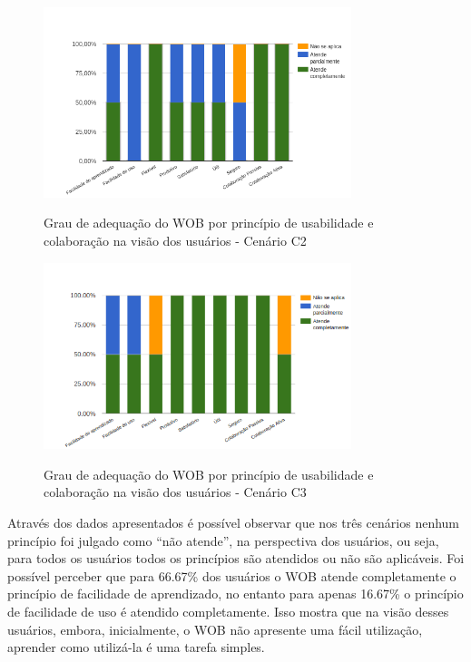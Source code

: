 \begin{figure}[!htb]
    \centering
    \caption{Grau de adequação do WOB por princípio de usabilidade e colaboração na visão dos usuários - Cenário C2}
    \includegraphics[width=0.8\textwidth]{./04-figuras/avaliacao-cenario2}
    \label{fig:avaliacao-cenario2}
\end{figure}

\begin{figure}[!htb]
    \centering
    \caption{Grau de adequação do WOB por princípio de usabilidade e colaboração na visão dos usuários - Cenário C3}
    \includegraphics[width=0.8\textwidth]{./04-figuras/avaliacao-cenario3}
    \label{fig:avaliacao-cenario3}
\end{figure}


Através dos dados apresentados é possível observar que nos três cenários nenhum princípio 
foi julgado como “não atende”, na perspectiva dos usuários, ou seja, para todos os usuários 
todos os princípios são atendidos ou não são aplicáveis. Foi possível perceber que para 
66.67\% dos usuários o WOB atende completamente o princípio de facilidade de aprendizado, no 
entanto para apenas 16.67\% o princípio de facilidade de uso é atendido completamente. Isso 
mostra que na visão desses usuários, embora, inicialmente, o WOB não apresente uma fácil 
utilização, aprender como utilizá-la é uma tarefa simples. 

